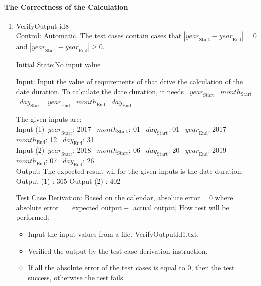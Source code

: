 \documentclass[12pt, titlepage]{article}
\begin{document}
\paragraph{The Correctness of the Calculation}
\begin{enumerate}
\item{VerifyOutput-id8\\}
Control: Automatic. The test cases contain cases that
$|\mathit{year}_\text{Start} - \mathit{year}_\text{End}| = 0$ and
$|\mathit{year}_\text{Start} - \mathit{year}_\text{End}| \geq 0$.

Initial State:No input value

Input: Input the value of requirements of \progname that drive the calculation
of the date duration. To calculate the date duration, it needs
~$\mathit{year}_\text{Start}$ 
~$\mathit{month}_\text{Start}$
~$\mathit{day}_\text{Start}$ 
~$\mathit{year}_\text{End}$
~$\mathit{month}_\text{End}$
 ~$\mathit{day}_\text{End}$ 

The given inputs are:\\
Input (1)~$\mathit{year}_\text{Start}$: 2017 ~$\mathit{month}_\text{Start}$: 01
~$\mathit{day}_\text{Start}$: 01 ~$\mathit{year}_\text{End}$: 2017
~$\mathit{month}_\text{End}$: 12 ~$\mathit{day}_\text{End}$: 31\\ 

Input (2)~$\mathit{year}_\text{Start}$: 2018 ~$\mathit{month}_\text{Start}$: 06
~$\mathit{day}_\text{Start}$: 20 ~$\mathit{year}_\text{End}$: 2019
~$\mathit{month}_\text{End}$: 07 ~$\mathit{day}_\text{End}$: 26\\

Output: The expected result wil for the given inputs is the date duration:\\
Output (1) : 365 Output (2) : 402


Test Case Derivation: Based on the calendar, $\text{absolute error} = 0$ where
$\text{absolute error} = |\text{ expected output} - \text{ actual output}|$
How test will be performed: 
\begin{itemize}
\item Input the input values from a file, VerifyOutputId1.txt. 
\item Verified the output by the test case derivation
instruction. 
\item If all the absolute error of the test cases is equal to 0, then the test
success, otherwise the test fails.


\end{itemize}
\end{enumerate}
\end{document}

